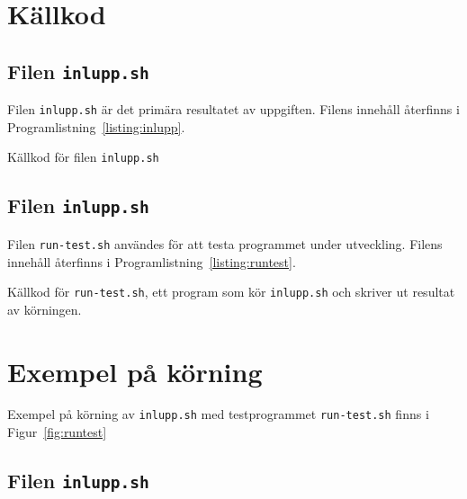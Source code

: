 %
%
%


\section{Källkod}

\subsection{Filen \texttt{inlupp.sh}}
Filen \texttt{inlupp.sh} är det primära resultatet av uppgiften.  
Filens innehåll återfinns i Programlistning~\ref{listing:inlupp}.


\begin{listing}[H]
\caption{Källkod för filen \texttt{inlupp.sh}}
\label{listing:inlupp}
\end{listing}


\subsection{Filen \texttt{inlupp.sh}}
Filen \texttt{run-test.sh} användes för att testa programmet under utveckling.
Filens innehåll återfinns i Programlistning~\ref{listing:runtest}.

\begin{listing}[H]
\caption{Källkod för \texttt{run-test.sh}, ett program som kör
         \texttt{inlupp.sh} och skriver ut resultat av körningen.}
\label{listing:runtest}
\end{listing}


\section{Exempel på körning}
Exempel på körning av \texttt{inlupp.sh} med testprogrammet \texttt{run-test.sh}
finns i Figur~\ref{fig:runtest}

\subsection{Filen \texttt{inlupp.sh}}
